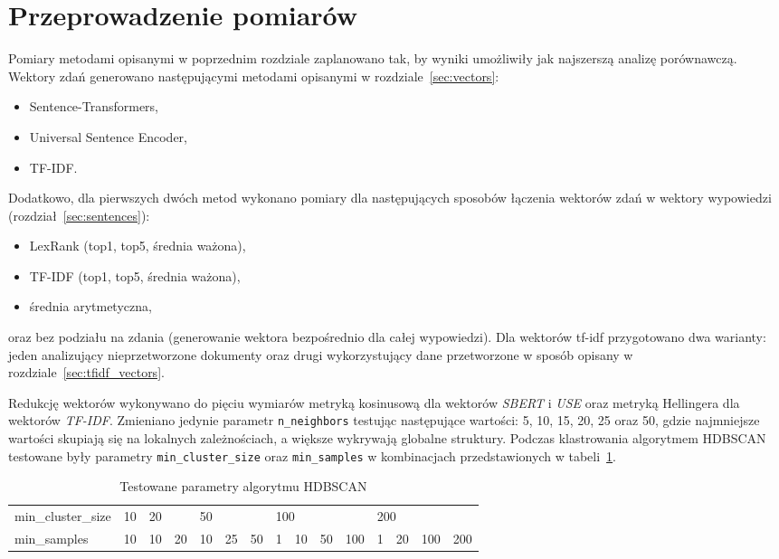 \section{Przeprowadzenie pomiarów}\label{sec:test_plan}
	Pomiary metodami opisanymi w poprzednim rozdziale zaplanowano tak, by wyniki umożliwiły jak najszerszą analizę porównawczą.
	Wektory zdań generowano następującymi metodami opisanymi w rozdziale~\ref{sec:vectors}:
	\begin{itemize}
		\item Sentence-Transformers,
		\item Universal Sentence Encoder,
		\item TF-IDF\@.
	\end{itemize}
	Dodatkowo, dla pierwszych dwóch metod wykonano pomiary dla następujących sposobów łączenia wektorów zdań w wektory wypowiedzi (rozdział~\ref{sec:sentences}):
	\begin{itemize}
		\item LexRank (top1, top5, średnia ważona),
		\item TF-IDF (top1, top5, średnia ważona),
		\item średnia arytmetyczna,
	\end{itemize}
	oraz bez podziału na zdania (generowanie wektora bezpośrednio dla całej wypowiedzi).
	Dla wektorów tf-idf przygotowano dwa warianty: jeden analizujący nieprzetworzone dokumenty
		oraz drugi wykorzystujący dane przetworzone w sposób opisany w rozdziale~\ref{sec:tfidf_vectors}.

	Redukcję wektorów wykonywano do pięciu wymiarów metryką kosinusową dla wektorów \emph{SBERT} i \emph{USE} oraz metryką Hellingera dla wektorów \emph{TF-IDF}.
	Zmieniano jedynie parametr \verb|n_neighbors| testując następujące wartości: 5, 10, 15, 20, 25 oraz 50, gdzie najmniejsze wartości skupiają się na lokalnych zależnościach,
		a większe wykrywają globalne struktury.
	Podczas klastrowania algorytmem HDBSCAN testowane były parametry \verb|min_cluster_size| oraz \verb|min_samples| w kombinacjach przedstawionych w tabeli~\ref{tab:hdbscan_params}.

	\begin{table}[htb]
		\caption{Testowane parametry algorytmu HDBSCAN}\label{tab:hdbscan_params}
		\centering
		\begin{tabular}{lrrrrrrrrrrrrrr}
			\toprule
			min\_cluster\_size	& 10 & \multicolumn{2}{l}{20} &  \multicolumn{3}{l}{50} & \multicolumn{4}{l}{100}	&  \multicolumn{4}{l}{200} \\
			min\_samples 				& 10 &  10 &  20 							&  10 &  25 &  50 				& 	1 &	10 &	50 &  100		&   1 &   20 &  100 &  200 \\
			\bottomrule
		\end{tabular}
	\end{table}

